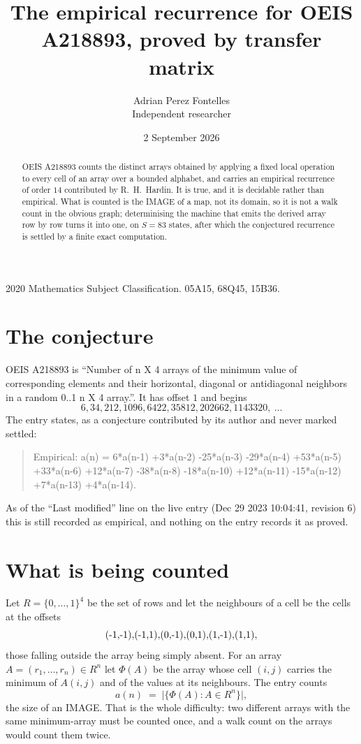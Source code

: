 \documentclass[11pt,a4paper]{article}
\title{The empirical recurrence for OEIS A218893, proved by transfer matrix}
\author{Adrian Perez Fontelles\\ \small Independent researcher}
\date{2 September 2026}
\theoremstyle{plain}
\theoremstyle{definition}
\begin{document}
\maketitle

\begin{abstract}
OEIS A218893 counts the distinct arrays obtained by applying a fixed local operation to every cell
of an array over a bounded alphabet, and carries an empirical recurrence of order $14$
contributed by R.~H.~Hardin. It is true, and it is decidable rather than empirical. What is
counted is the IMAGE of a map, not its domain, so it is not a walk count in the obvious graph;
determinising the machine that emits the derived array row by row turns it into one, on
$S=83$ states, after which the conjectured recurrence is settled by a finite exact
computation.
\end{abstract}

\noindent\small 2020 Mathematics Subject Classification. 05A15, 68Q45, 15B36.\normalsize

\section{The conjecture}

OEIS A218893 is ``Number of n X 4 arrays of the minimum value of corresponding elements and their horizontal, diagonal or antidiagonal neighbors in a random 0..1 n X 4 array.''. It has offset $1$ and begins
\[
6, 34, 212, 1096, 6422, 35812, 202662, 1143320,\ \dots
\]
The entry states, as a conjecture contributed by its author and never marked settled:
\begin{quote}
Empirical: a(n) = 6*a(n-1) +3*a(n-2) -25*a(n-3) -29*a(n-4) +53*a(n-5) +33*a(n-6) +12*a(n-7) -38*a(n-8) -18*a(n-10) +12*a(n-11) -15*a(n-12) +7*a(n-13) +4*a(n-14).
\end{quote}
As of the ``Last modified'' line on the live entry (Dec 29 2023 10:04:41, revision 6) this is still
recorded as empirical, and nothing on the entry records it as proved.

\section{What is being counted}

Let $R=\{0,\dots,1\}^{4}$ be the set of rows and let the neighbours of
a cell be the cells at the offsets
\[
$(-1,-1)$, $(-1,1)$, $(0,-1)$, $(0,1)$, $(1,-1)$, $(1,1)$,
\]
those falling outside the array being simply absent. For an array
$A=(r_1,\dots,r_n)\in R^n$ let $\Phi(A)$ be the array whose cell $(i,j)$ carries the
minimum of $A(i,j)$ and of the values at its neighbours. The entry counts
\[
a(n)\;=\;\bigl|\{\Phi(A):A\in R^n\}\bigr| ,
\]
the size of an IMAGE. That is the whole difficulty: two different arrays with the same
minimum-array must be counted once, and a walk count on the arrays would count them twice.
\end{document}
